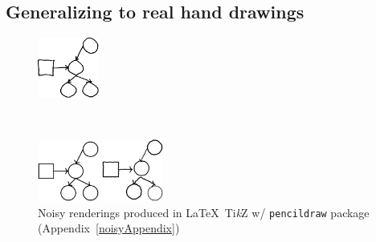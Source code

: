 \documentclass{article}
\theoremstyle{definition}
\begin{document}
\subsection{Generalizing to real hand drawings}\label{generalizingTheHandDrawings}
\begin{figure}
\vspace{-0.7cm}\centering\vspace{-0.7cm}  \begin{minipage}[t]{2.5cm}\centering\includegraphics[width = 2cm]{figures/expert-60-reduced.png}
  \end{minipage}\\
   \begin{minipage}[t]{2.5cm}\includegraphics[width = 2cm]{figures/60-groundTruth-reduced.png}
  \end{minipage}\qquad%
  \begin{minipage}[t]{2.5cm}\includegraphics[width = 2cm]{figures/60-1-reduced.png}
  \end{minipage}%
  \caption{Noisy renderings produced in \LaTeX~Ti\emph{k}Z w/ \texttt{pencildraw} package (Appendix~\ref{noisyAppendix})}
    \label{handDrawingExamples} \vspace{-1cm}
\end{figure}
\end{document}
